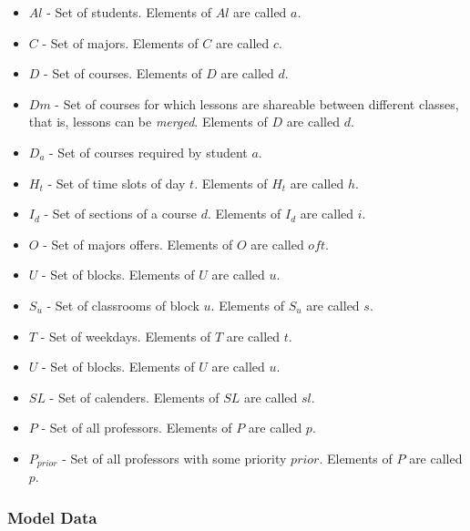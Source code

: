 \begin{itemize}
\item $Al$ - Set of students. Elements of $Al$ are called $a$.
\item $C$ - Set of majors. Elements of $C$ are called $c$.
\item $D$ - Set of courses. Elements of $D$ are called $d$.
\item $Dm$ - Set of courses for which lessons are shareable between different classes, that is, lessons can be \textit{merged}. Elements of $D$ are called $d$.
\item $D_{a}$ - Set of courses required by student $a$.
\item $H_{t}$ - Set of time slots of day $t$. Elements of $H_{t}$ are called $h$.
\item $I_{d}$ - Set of sections of a course $d$. Elements of $I_{d}$ are called $i$.
\item $O$ - Set of majors offers. Elements of $O$ are called $oft$.
\item $U$ - Set of blocks. Elements of $U$ are called $u$.
\item $S_{u}$ - Set of classrooms of block $u$. Elements of $S_{u}$ are called $s$.
\item $T$ - Set of weekdays. Elements of $T$ are called $t$.
\item $U$ - Set of blocks. Elements of $U$ are called $u$.
\item $SL$ - Set of calenders. Elements of $SL$ are called $sl$.
\item $P$ - Set of all professors. Elements of $P$ are called $p$.
\item $P_{prior}$ - Set of all professors with some priority $prior$. Elements of $P$ are called $p$.
\end{itemize}

\subsubsection{Model Data}

